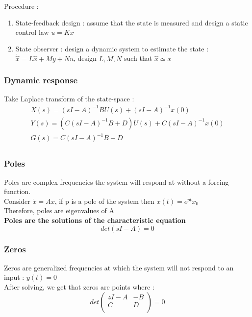 \documentclass[../main.tex]{subfiles}
\begin{document}
Procedure : \begin{enumerate}
    \item State-feedback design : assume that the state is measured and design a static control law $u=Kx$\\
    \item State observer : design a dynamic system to estimate the state : $\dot{\hat{x}} = L\hat{x} + My + Nu$, design $L,M,N$ such that $\hat{x} \simeq x$\\
\end{enumerate}

\subsubsection{Dynamic response}
Take Laplace transform of the state-space : \begin{equation}
    \begin{gathered}
        X(s) = (sI-A)^{-1}BU(s) + (sI-A)^{-1}x(0)\\
        Y(s) = (C(sI-A)^{-1}B+D)U(s) + C(sI-A)^{-1}x(0)\\
        G(s) = C(sI-A)^{-1}B+D\\
    \end{gathered}
\end{equation}

\subsubsection{Poles}
Poles are complex frequencies the system will respond at without a forcing function.\\

Consider $\dot{x} = Ax$, if p is a pole of the system then $x(t) = e^{pt}x_0$\\
\warning Therefore, poles are eigenvalues of A\\

\textbf{Poles are the solutions of the characteristic equation} \begin{equation}
    det(sI-A)=0
\end{equation}

\subsubsection{Zeros}
Zeros are generalized frequencies at which the system will not respond to an input : $y(t) = 0$\\

After solving, we get that zeros are points where : \begin{equation}
    det \begin{pmatrix}
        zI-A & -B\\
        C & D\\
    \end{pmatrix} = 0
\end{equation}
\end{document}
